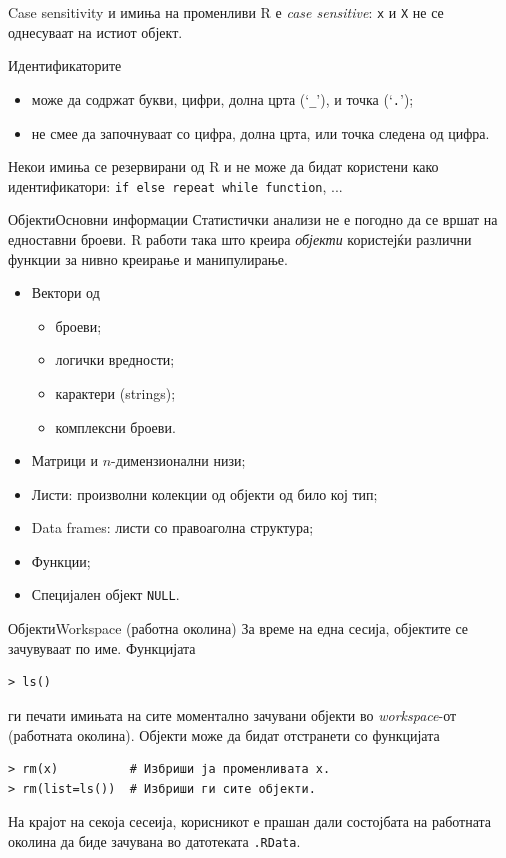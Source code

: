 \documentclass[hyperref={unicode}, xcolor={svgnames, table},
usepdftitle=false]{beamer}
\theoremstyle{remark}
\begin{document}
\begin{frame}{Case sensitivity и имиња на променливи}
  R е \emph{case sensitive}: \texttt{x} и \texttt{X} не се
  однесуваат на истиот објект.

  Идентификаторите
  \begin{itemize}
  \item може да содржат букви, цифри, долна црта (`\texttt{\_}'), и точка
    (`\texttt{.}');
  \item не смее да започнуваат со цифра, долна црта, или точка следена од цифра.
  \end{itemize}

  Некои имиња се резервирани од R и не може да бидат користени како
  идентификатори: \texttt{if else repeat while function}, ...
\end{frame}

\begin{frame}{Објекти}{Основни информации}
  Статистички анализи не е погодно да се вршат на едноставни броеви.  R работи
  така што креира \emph{објекти} користејќи различни функции за нивно креирање и
  манипулирање.
  \begin{itemize}
  \item Вектори од
    \begin{itemize}
    \item броеви;
    \item логички вредности;
    \item карактери (strings);
    \item комплексни броеви.
    \end{itemize}
  \item Матрици и \(n\)-димензионални низи;
  \item Листи: произволни колекции од објекти од било кој тип;
  \item Data frames: листи со правоаголна структура;
  \item Функции;
  \item Специјален објект \texttt{NULL}.
  \end{itemize}
\end{frame}

\begin{frame}[fragile]{Објекти}{Workspace (работна околина)}
  За време на една сесија, објектите се зачувуваат по име.  Функцијата
\begin{verbatim}
> ls()
\end{verbatim}
  ги печати имињата на сите моментално зачувани објекти во \emph{workspace}-от
  (работната околина).  Објекти може да бидат отстранети со функцијата
\begin{verbatim}
> rm(x)          # Избриши ја променливата x.
> rm(list=ls())  # Избриши ги сите објекти.
\end{verbatim}

  На крајот на секоја сесеија, корисникот е прашан дали состојбата на работната
  околина да биде зачувана во датотеката \texttt{.RData}.
\end{frame}
\end{document}
